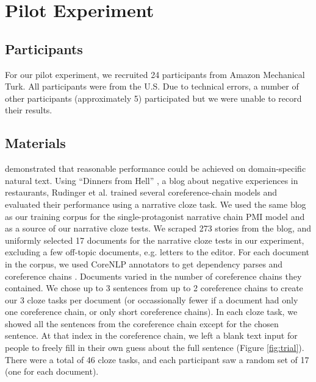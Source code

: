 \documentclass[10pt,a4paper]{article}
\newcommand{\todo}[1]{{\color{red}#1}}
\begin{document}


\section{Pilot Experiment}


\subsection{Participants}

For our pilot experiment, we recruited
24 participants from Amazon Mechanical Turk.
All participants were from the U.S.
Due to technical errors, a number of other participants (approximately 5) participated but we were unable to record their results.

\subsection{Materials}

 demonstrated that reasonable performance could be achieved on domain-specific natural text.
Using ``Dinners from Hell'' \cite{dinnersfromhell}, a blog about negative experiences in restaurants, Rudinger et al. trained several coreference-chain models and evaluated their performance using a narrative cloze task.
We used the same blog as our training corpus for the single-protagonist narrative chain PMI model and as a source of our narrative cloze tests.
We scraped 273 stories from the blog, and uniformly selected 17 documents for the narrative cloze tests in our experiment, excluding a few off-topic documents, e.g. letters to the editor.
For each document in the corpus, we used CoreNLP annotators \cite{corenlp} to get dependency parses \cite{depparse} and coreference chains \cite{coref2013a, coref2013b, coref2011, coref2010}.
Documents varied in the number of coreference chains they contained. We chose up to 3 sentences from up to 2 coreference chains to create our 3 cloze tasks per document (or occassionally fewer if a document had only one coreference chain, or only short coreference chains). In each cloze task, we showed all the sentences from the coreference chain except for the chosen sentence. At that index in the coreference chain, we left a blank text input for people to freely fill in their own guess about the full sentence (Figure \ref{fig:trial}). There were a total of 46 cloze tasks, and each participant saw a random set of 17 (one for each document).
\end{document}
